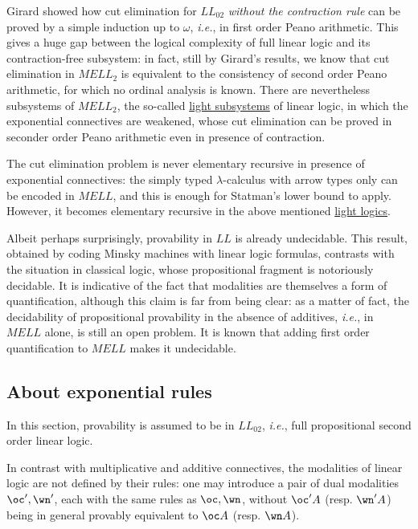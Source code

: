 Girard showed how cut elimination for \(LL_{02}\) \emph{without the
contraction rule} can be proved by a simple induction up to \(\omega\),
\emph{i.e.}, in first order Peano arithmetic. This gives a huge gap
between the logical complexity of full linear logic and its
contraction-free subsystem: in fact, still by Girard's results, we know
that cut elimination in \(MELL_2\) is equivalent to the consistency of
second order Peano arithmetic, for which no ordinal analysis is known.
There are nevertheless subsystems of \(MELL_2\), the so-called
\href{Light_linear_logics}{light subsystems} of linear logic, in which
the exponential connectives are weakened, whose cut elimination can be
proved in seconder order Peano arithmetic even in presence of
contraction.

The cut elimination problem is never elementary recursive in presence of
exponential connectives: the simply typed \(\lambda\)-calculus with
arrow types only can be encoded in \(MELL\), and this is enough for
Statman's lower bound to apply. However, it becomes elementary recursive
in the above mentioned \href{Light_linear_logics}{light logics}.

Albeit perhaps surprisingly, provability in \(LL\) is already
undecidable. This result, obtained by coding Minsky machines with linear
logic formulas, contrasts with the situation in classical logic, whose
propositional fragment is notoriously decidable. It is indicative of the
fact that modalities are themselves a form of quantification, although
this claim is far from being clear: as a matter of fact, the
decidability of propositional provability in the absence of additives,
\emph{i.e.}, in \(MELL\) alone, is still an open problem. It is known
that adding first order quantification to \(MELL\) makes it undecidable.

\subsection{About exponential rules}\label{about-exponential-rules}

In this section, provability is assumed to be in \(LL_{02}\),
\emph{i.e.}, full propositional second order linear logic.

In contrast with multiplicative and additive connectives, the modalities
of linear logic are not defined by their rules: one may introduce a pair
of dual modalities \(\oc',\wn'\), each with the same rules as
\(\oc,\wn\), without \(\oc'A\) (resp. \(\wn'A\)) being in general
provably equivalent to \(\oc A\) (resp. \(\wn A\)).

